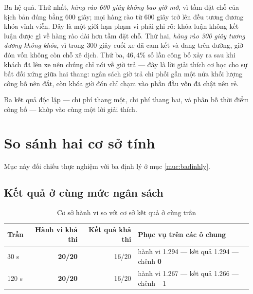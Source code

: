 Ba hệ quả. Thứ nhất, \emph{hàng rào 600 giây không bao giờ mở}, vì tầm đặt chỗ của kịch bản đúng
bằng 600 giây; mọi hàng rào từ 600 giây trở lên đều tương đương khóa vĩnh viễn. Đây là một giới
hạn phạm vi phải ghi rõ: khóa luận không kết luận được gì về hàng rào dài hơn tầm đặt chỗ. Thứ
hai, \emph{hàng rào 300 giây tương đương không khóa}, vì trong 300 giây cuối xe đã cam kết và
đang trên đường, giờ đón vốn không còn chỗ xê dịch. Thứ ba, $46{,}4\%$ số lần công bố xảy ra sau
khi khách đã lên xe nên chúng chỉ nói về giờ trả --- đây là lời giải thích cơ học cho sự bất đối
xứng giữa hai thang: ngân sách giờ trả chi phối gần một nửa khối lượng công bố nên đắt, còn khóa
giờ đón chỉ chạm vào phần đầu vốn đã chật nên rẻ.

Ba kết quả độc lập --- chi phí thang một, chi phí thang hai, và phân bố thời điểm công bố ---
khớp vào cùng một lời giải thích.

\section{So sánh hai cơ sở tính}
\label{muc:haicoso}

Mục này đối chiếu thực nghiệm với ba định lý ở mục \ref{muc:badinhly}.

\subsection{Kết quả ở cùng mức ngân sách}

\begin{table}[htbp]
\centering
\caption{Cơ sở hành vi so với cơ sở kết quả ở cùng trần}
\label{bang:coso}
\small
\begin{tabular}{@{}lrrl@{}}
\toprule
\textbf{Trần} & \textbf{Hành vi khả thi} & \textbf{Kết quả khả thi} & \textbf{Phục vụ trên các ô chung}\\
\midrule
30 s & \textbf{20/20} & 16/20 & hành vi 1.294 --- kết quả 1.294 --- chênh \textbf{0}\\
120 s & \textbf{20/20} & 16/20 & hành vi 1.267 --- kết quả 1.266 --- chênh $-1$\\
\bottomrule
\end{tabular}
\end{table}

